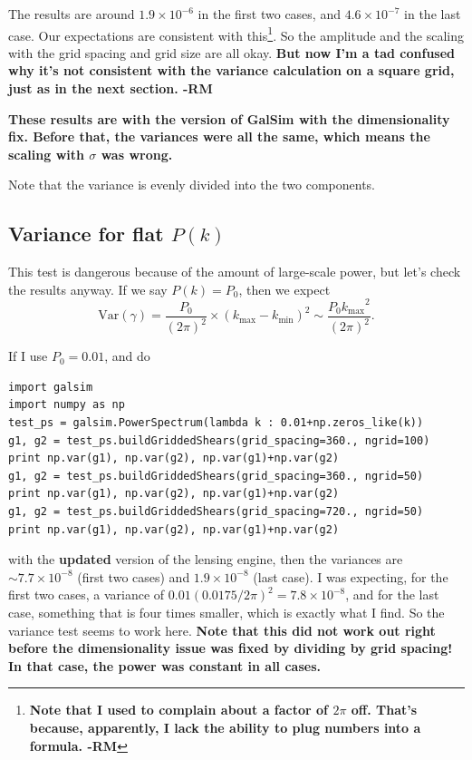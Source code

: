 \documentclass[preprint]{aastex}
\newcommand{\kmax}{\ensuremath{k_\mathrm{max}}}
\newcommand{\kmin}{\ensuremath{k_\mathrm{min}}}
\newcommand{\beq}{\begin{equation}}
\newcommand{\eeq}{\end{equation}}
\begin{document}
The results are around $1.9\times 10^{-6}$ in the first two cases, and
$4.6\times 10^{-7}$ in the last case.  Our expectations are consistent
with this\footnote{\textbf{Note that I used to complain about a factor
  of $2\pi$ off.  That's because, apparently, I lack the ability to
  plug numbers into a formula.  -RM}}.
So the amplitude and the scaling with the grid spacing and grid size
are all okay.  \textbf{But now I'm a tad confused why it's not
  consistent with the variance calculation on a square grid, just as
  in the next section. -RM}

 \textbf{These results are with the version of GalSim
  with the dimensionality fix.  Before that, the variances were all
  the same, which means the scaling with $\sigma$ was wrong.}

Note that the variance is evenly divided into the two components.

\subsection{Variance for flat $P(k)$}

This test is dangerous because of the amount of large-scale power, but
let's check the results anyway.  If we say $P(k)=P_0$, then we expect
\beq
\mathrm{Var}(\gamma) = \frac{P_0}{(2\pi)^2} \times (\kmax-\kmin)^2
\sim \frac{P_0 \kmax^2}{(2\pi)^2}.
\eeq

If I use $P_0=0.01$, and do 
\begin{verbatim}
import galsim
import numpy as np
test_ps = galsim.PowerSpectrum(lambda k : 0.01+np.zeros_like(k))
g1, g2 = test_ps.buildGriddedShears(grid_spacing=360., ngrid=100)
print np.var(g1), np.var(g2), np.var(g1)+np.var(g2)
g1, g2 = test_ps.buildGriddedShears(grid_spacing=360., ngrid=50)
print np.var(g1), np.var(g2), np.var(g1)+np.var(g2)
g1, g2 = test_ps.buildGriddedShears(grid_spacing=720., ngrid=50)
print np.var(g1), np.var(g2), np.var(g1)+np.var(g2)
\end{verbatim}
with the \textbf{updated} version of the lensing engine, then the variances are $\sim 7.7\times 10^{-8}$ (first two cases) and
$1.9\times 10^{-8}$ (last case).  I was expecting, for the first two
cases, a variance of $0.01 (0.0175/2\pi)^2=7.8\times 10^{-8}$, and for
the last case, something that is four times smaller, which is exactly
what I find.  So the variance test seems to work here.  \textbf{Note
  that this did not work out right before the dimensionality issue was
  fixed by dividing by grid spacing!  In that case, the power was
  constant in all cases.}
\end{document}
